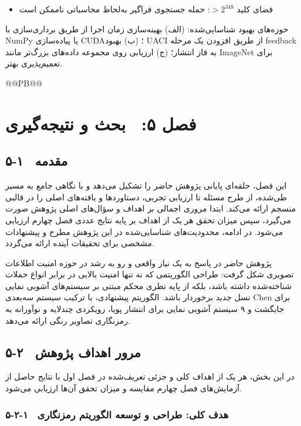 \begin{itemize}
    \item فضای کلید $> 2^{348}$: حمله جستجوی فراگیر به‌لحاظ محاسباتی ناممکن است
\end{itemize}

حوزه‌های بهبود شناسایی‌شده:  (الف) بهینه‌سازی زمان اجرا از طریق برداری‌سازی با ‎NumPy‎ یا پیاده‌سازی ‎CUDA‎؛ (ب) بهبود ‎UACI‎ از طریق افزودن یک مرحله ‎feedback‎ به فاز انتشار؛ (ج) ارزیابی روی مجموعه داده‌های بزرگ‌تر مانند ‎ImageNet‎ برای تعمیم‌پذیری بهتر.


@@PB@@







\chapter{فصل ۵:  بحث و نتیجه‌گیری}
\section{۵-۱  مقدمه}

این فصل، حلقه‌ای پایانی پژوهش حاضر را تشکیل می‌دهد و با نگاهی جامع به مسیر طی‌شده، از طرح مسئله تا ارزیابی تجربی، دستاوردها و یافته‌های اصلی را در قالبی منسجم ارائه می‌کند. ابتدا مروری اجمالی بر اهداف و سؤال‌های اصلی پژوهش صورت می‌گیرد، سپس میزان تحقق هر یک از اهداف بر پایه نتایج عددی فصل چهارم ارزیابی می‌شود. در ادامه، محدودیت‌های شناسایی‌شده در این پژوهش مطرح و پیشنهادات مشخصی برای تحقیقات آینده ارائه می‌گردد.

پژوهش حاضر در پاسخ به یک نیاز واقعی و رو به رشد در حوزه امنیت اطلاعات تصویری شکل گرفت: طراحی الگوریتمی که نه تنها امنیت بالایی در برابر انواع حملات شناخته‌شده داشته باشد، بلکه از پایه نظری محکم مبتنی بر سیستم‌های آشوبی نمایی نسل جدید برخوردار باشد. الگوریتم پیشنهادی، با ترکیب سیستم سه‌بعدی ‎Chen‎ برای جایگشت و ۹ سیستم آشوبی نمایی برای انتشار پویا، رویکردی چندلایه و نوآورانه به رمزنگاری تصاویر رنگی ارائه می‌دهد.

\section{۵-۲  مرور اهداف پژوهش}

در این بخش، هر یک از اهداف کلی و جزئی تعریف‌شده در فصل اول با نتایج حاصل از آزمایش‌های فصل چهارم مقایسه و میزان تحقق آن‌ها ارزیابی می‌شود.

\subsection{۵-۲-۱  هدف کلی: طراحی و توسعه الگوریتم رمزنگاری}


